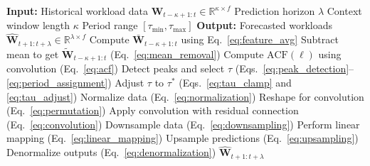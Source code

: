 \begin{algorithm}
\caption{\ac{AERO} Model Implementation}
\label{alg:aero_impl}
\footnotesize
\renewcommand{\baselinestretch}{0.9}
\begin{algorithmic}[1]
\Require
    \Statex \hspace{-1em}\textbf{Input:}
    \State Historical workload data $\mathbf{W}_{t-\kappa+1:t} \in \mathbb{R}^{\kappa \times f}$
    \State Prediction horizon $\lambda$
    \State Context window length $\kappa$
    \State Period range $[\tau_{\min}, \tau_{\max}]$
\Ensure
    \Statex \hspace{-1em}\textbf{Output:}
    \State Forecasted workloads $\hat{\mathbf{W}}_{t+1:t+\lambda} \in \mathbb{R}^{\lambda \times f}$
\Statex
{}
    \State Compute $\bar{\mathbf{W}}_{t-\kappa+1:t}$ using Eq.~\eqref{eq:feature_avg}
    \State Subtract mean to get $\tilde{\mathbf{W}}_{t-\kappa+1:t}$ \hfill {\small(Eq.~\eqref{eq:mean_removal})}
    \State Compute $\text{ACF}(\ell)$ using convolution \hfill {\small(Eq.~\eqref{eq:acf})}
    \State Detect peaks and select $\tau$ \hfill {\small(Eqs.~\eqref{eq:peak_detection}--\eqref{eq:period_assignment})}
\Statex
{}
    \State Adjust $\tau$ to $\tau^{\ast}$ \hfill {\small(Eqs.~\eqref{eq:tau_clamp} and \eqref{eq:tau_adjust})}
\Statex
{}
    \State Normalize data \hfill {\small(Eq.~\eqref{eq:normalization})}
    \State Reshape for convolution \hfill {\small(Eq.~\eqref{eq:permutation})}
    \State Apply convolution with residual connection \hfill {\small(Eq.~\eqref{eq:convolution})}
    \State Downsample data \hfill {\small(Eq.~\eqref{eq:downsampling})}
    \State Perform linear mapping \hfill {\small(Eq.~\eqref{eq:linear_mapping})}
    \State Upsample predictions \hfill {\small(Eq.~\eqref{eq:upsampling})}
    \State Denormalize outputs \hfill {\small(Eq.~\eqref{eq:denormalization})}
\Statex
{}
    \State \Return $\hat{\mathbf{W}}_{t+1:t+\lambda}$
\end{algorithmic}
\end{algorithm}
